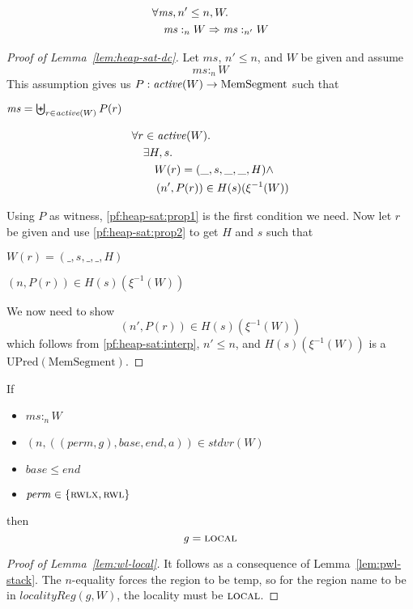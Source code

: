 \documentclass[a4paper]{article}
\newcommand{\fun}{\rightarrow}
\newcommand{\var}[1]{\mathit{#1}}
\newcommand{\hs}{\var{ms}}
\newcommand{\ms}{\hs}
\newcommand{\gl}{\var{g}}
\newcommand{\addr}{\var{a}}
\newcommand{\start}{\var{base}}
\newcommand{\addrend}{\var{end}}
\newcommand{\heap}{\var{mem}}
\newcommand{\perm}{\var{perm}}
\newcommand{\stdcap}[1][(\perm,\gl)]{\left(#1,\start,\addrend,\addr \right)}
\newcommand{\plainfun}[2]{
  \ifthenelse{\equal{#2}{}}
  {\mathit{#1}}
  {\mathit{#1}(#2)}
}
\newcommand{\activeReg}[1]{\plainfun{active}{#1}}
\newcommand{\heapSat}[3][\heap]{#1 :_{#2} #3}
\newcommand{\memSat}[3][n]{\heapSat[#2]{#1}{#3}}
\newcommand{\plaindom}[1]{\mathrm{#1}}
\newcommand{\HeapSegments}{\plaindom{MemSegment}}
\newcommand{\MemSegments}{\HeapSegments}
\newcommand{\UPred}[1]{\plaindom{UPred}(#1)}
\newcommand{\npair}[2][n]{\left(#1,#2 \right)}
\newcommand{\plainperm}[1]{\textsc{#1}}
\newcommand{\readwritel}{\plainperm{rwl}}
\newcommand{\rwl}{\readwritel}
\newcommand{\rwlx}{\plainperm{rwlx}}
\newcommand{\local}{\plainperm{local}}
\newcommand{\localityReg}{\var{localityReg}}
\newcommand{\plainview}[1]{\mathrm{#1}}
\newcommand{\temp}{\plainview{temp}}
\begin{document}
\begin{lemma}
  \label{lem:heap-sat-dc}
  \begin{align*}
    &\forall \hs, n' \leq n, W \ldotp \\
    &\quad \heapSat[\hs]{n}{W} \Rightarrow \heapSat[\hs]{n'}{W}
  \end{align*}
\end{lemma} 
\begin{proof}[Proof of Lemma~\ref{lem:heap-sat-dc}]
  Let $\ms$, $n' \leq n$, and $W$ be given and assume
  \[
    \heapSat[\hs]{n}{W}
  \]
  This assumption gives us $P : \activeReg{W} \fun \MemSegments$ such that
  \begin{enumproof}
    \item $\hs = \biguplus_{r\in\activeReg{W}}P(r)$ \label{pf:heap-sat:prop1}
    \item \label{pf:heap-sat:prop2}
      \begin{align*}
        &\forall r \in \activeReg{W} \ldotp\\
        &\quad \exists H,s \ldotp\\
        &\qquad W(r) = (\_,s,\_,\_,H) \land \\
        &\qquad \npair[n']{P(r)} \in H(s)(\xi^{-1}(W))
      \end{align*}
  \end{enumproof}
  Using $P$ as witness, \ref{pf:heap-sat:prop1} is the first condition we need. Now let $r$ be given and use \ref{pf:heap-sat:prop2} to get $H$ and $s$ such that
  \begin{enumproof}[resume]
    \item $W(r) = (\_,s,\_,\_,H)$ 
    \item $\npair[n]{P(r)} \in H(s)(\xi^{-1}(W))$ \label{pf:heap-sat:interp}
  \end{enumproof}
We now need to show
\[
        \npair[n']{P(r)} \in H(s)(\xi^{-1}(W))
\]
which follows from \ref{pf:heap-sat:interp}, $n' \leq n$, and $H(s)(\xi^{-1}(W))$ is a $\UPred{\MemSegments}$.
\end{proof}

\begin{lemma}
  \label{lem:wl-local}
  If
  \begin{itemize}
  \item $\memSat{\ms}{W}$
  \item $\npair{\stdcap} \in stdvr(W)$
  \item $\start \leq \addrend$
  \item $\perm \in \{\rwlx,\rwl\}$
  \end{itemize}
  then 
  \[
    \gl = \local
  \]
\end{lemma}
\begin{proof}[Proof of Lemma~\ref{lem:wl-local}]
It follows as a consequence of Lemma~\ref{lem:pwl-stack}. The $n$-equality forces the region to be $\temp$, so for the region name to be in $\localityReg(\gl,W)$, the locality must be $\local$.
\end{proof}
\end{document}
